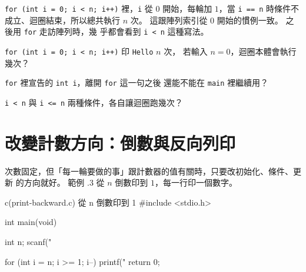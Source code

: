 
\texttt{for (int i = 0; i < n; i++)} 裡，\texttt{i} 從 $0$ 開始，每輪加
$1$，當 \texttt{i == n} 時條件不成立、迴圈結束，所以總共執行 $n$ 次。
這跟陣列索引從 $0$ 開始的慣例一致。 之後用 \texttt{for} 走訪陣列時，幾
乎都會看到 \texttt{i < n} 這種寫法。




\begin{drills}[label=drills:loop-for-basics]
\item \texttt{for (int i = 0; i < n; i++)} 印 \texttt{Hello} $n$ 次，
若輸入 $n = 0$，迴圈本體會執行幾次？
\item \texttt{for} 裡宣告的 \texttt{int i}，離開 \texttt{for} 這一句之後
還能不能在 \texttt{main} 裡繼續用？
\item \texttt{i < n} 與 \texttt{i <= n} 兩種條件，各自讓迴圈跑幾次？
\end{drills}

\section{改變計數方向：倒數與反向列印}
\label{sec:loop-countdown}

次數固定，但「每一輪要做的事」跟計數器的值有關時，只要改初始化、條件、更新
的方向就好。 範例 \thechapter.3 從 $n$ 倒數印到 $1$，每一行印一個數字。

\begin{example}{c}{(print-backward.c) 從 n 倒數印到 1}
#include <stdio.h>

int main(void) {
    int n;
    scanf("%

    for (int i = n; i >= 1; i--) {
        printf("%
    }
    return 0;
}
\end{example}


